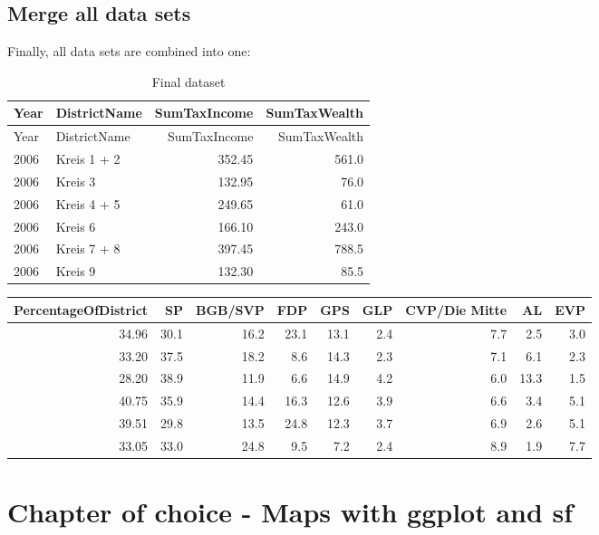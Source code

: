 \documentclass[
]{article}
\begin{document}
\hypertarget{merge-all-data-sets}{%
\subsection{Merge all data sets}\label{merge-all-data-sets}}

Finally, all data sets are combined into one:

\begin{longtable}[]{@{}llrr@{}}
\caption{Final dataset}\tabularnewline
\toprule
Year & DistrictName & SumTaxIncome & SumTaxWealth \\
\midrule
\endfirsthead
\toprule
Year & DistrictName & SumTaxIncome & SumTaxWealth \\
\midrule
\endhead
2006 & Kreis 1 + 2 & 352.45 & 561.0 \\
2006 & Kreis 3 & 132.95 & 76.0 \\
2006 & Kreis 4 + 5 & 249.65 & 61.0 \\
2006 & Kreis 6 & 166.10 & 243.0 \\
2006 & Kreis 7 + 8 & 397.45 & 788.5 \\
2006 & Kreis 9 & 132.30 & 85.5 \\
\bottomrule
\end{longtable}

\begin{longtable}[]{@{}rrrrrrrrr@{}}
\toprule
PercentageOfDistrict & SP & BGB/SVP & FDP & GPS & GLP & CVP/Die Mitte &
AL & EVP \\
\midrule
\endhead
34.96 & 30.1 & 16.2 & 23.1 & 13.1 & 2.4 & 7.7 & 2.5 & 3.0 \\
33.20 & 37.5 & 18.2 & 8.6 & 14.3 & 2.3 & 7.1 & 6.1 & 2.3 \\
28.20 & 38.9 & 11.9 & 6.6 & 14.9 & 4.2 & 6.0 & 13.3 & 1.5 \\
40.75 & 35.9 & 14.4 & 16.3 & 12.6 & 3.9 & 6.6 & 3.4 & 5.1 \\
39.51 & 29.8 & 13.5 & 24.8 & 12.3 & 3.7 & 6.9 & 2.6 & 5.1 \\
33.05 & 33.0 & 24.8 & 9.5 & 7.2 & 2.4 & 8.9 & 1.9 & 7.7 \\
\bottomrule
\end{longtable}

\pagebreak

\hypertarget{chapter-of-choice---maps-with-ggplot-and-sf}{%
\section{Chapter of choice - Maps with ggplot and
sf}\label{chapter-of-choice---maps-with-ggplot-and-sf}}
\end{document}
